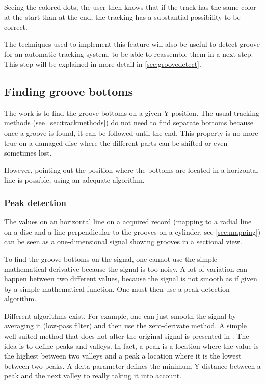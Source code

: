 Seeing the colored dots, the user then knows that if the track has the same color at the start than at the end, the tracking has a substantial possibility to be correct.

The techniques used to implement this feature will also be useful to detect groove for an automatic tracking system, to be able to reassemble them in a next step. This step will be explained in more detail in \autoref{sec:groovedetect}.

\subsection{Finding groove bottoms}

The work is to find the groove bottoms on a given Y-position. The usual tracking methods (see~\autoref{sec:trackmethods}) do not need to find separate bottoms because once a groove is found, it can be followed until the end. This property is no more true on a damaged disc where the different parts can be shifted or even sometimes lost.

However, pointing out the position where the bottoms are located in a horizontal line is possible, using an adequate algorithm.

\subsubsection{Peak detection}
\label{sec:peakdetect}

The values on an horizontal line on a acquired record (mapping to a radial line on a disc and a line perpendicular to the grooves on a cylinder, see \autoref{sec:mapping}) can be seen as a one-dimensional signal showing grooves in a sectional view.

To find the groove bottoms on the signal, one cannot use the simple mathematical derivative because the signal is too noisy. A lot of variation can happen between two different values, because the signal is not smooth as if given by a simple mathematical function. One must then use a peak detection algorithm.

Different algorithms exist. For example, one can just smooth the signal by averaging it (low-pass filter) and then use the zero-derivate method. A simple well-suited method that does not alter the original signal is presented in \cite{peak12}. The idea is to define peaks and valleys. In fact, a peak is a location where the value is the highest between two valleys and a peak a location where it is the lowest between two peaks. A delta parameter defines the minimum Y distance between a peak and the next valley to really taking it into account.

